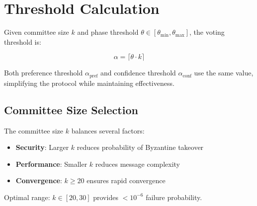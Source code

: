 \section{Threshold Calculation}

\label{sec:threshold}

Given committee size $k$ and phase threshold $\theta \in [\theta_{\min}, \theta_{\max}]$, the voting threshold is:

\begin{equation}
\alpha = \lceil \theta \cdot k \rceil
\label{eq:alpha}
\end{equation}

Both preference threshold $\alpha_{\text{pref}}$ and confidence threshold $\alpha_{\text{conf}}$ use the same value, simplifying the protocol while maintaining effectiveness.

\subsection{Committee Size Selection}

The committee size $k$ balances several factors:

\begin{itemize}
\item \textbf{Security}: Larger $k$ reduces probability of Byzantine takeover
\item \textbf{Performance}: Smaller $k$ reduces message complexity
\item \textbf{Convergence}: $k \geq 20$ ensures rapid convergence
\end{itemize}

Optimal range: $k \in [20, 30]$ provides $< 10^{-6}$ failure probability.

